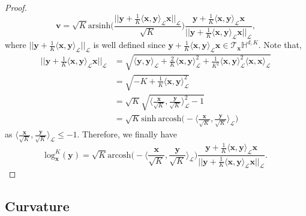 \documentclass{article}
\begin{document}
\begin{proof}
$$\mathbf{v}=\sqrt{K}\mathrm{arsinh}\bigg(\frac{||\mathbf{y}+\frac{1}{K}\langle\mathbf{x},\mathbf{y}\rangle_\mathcal{L}\mathbf{x}||_\mathcal{L}}{\sqrt{K}}\bigg)\frac{\mathbf{y}+\frac{1}{K}\langle\mathbf{x},\mathbf{y}\rangle_\mathcal{L}\mathbf{x}}{||\mathbf{y}+\frac{1}{K}\langle\mathbf{x},\mathbf{y}\rangle_\mathcal{L}\mathbf{x}||_\mathcal{L}},$$
where $||\mathbf{y}+\frac{1}{K}\langle\mathbf{x},\mathbf{y}\rangle_\mathcal{L}||_\mathcal{L}$ is well defined since $\mathbf{y}+\frac{1}{K}\langle\mathbf{x},\mathbf{y}\rangle_\mathcal{L}\mathbf{x}\in\mathcal{T}_{\mathbf{x}}\mathbb{H}^{d,K}$.
Note that,
\begin{align*}
	||\mathbf{y}+\frac{1}{K}\langle\mathbf{x},\mathbf{y}\rangle_\mathcal{L}\mathbf{x}||_\mathcal{L}&=\sqrt{\langle\mathbf{y},\mathbf{y}\rangle_\mathcal{L}+\frac{2}{K}\langle\mathbf{x},\mathbf{y}\rangle_\mathcal{L}^2+\frac{1}{K^2}\langle\mathbf{x},\mathbf{y}\rangle_\mathcal{L}^2\langle\mathbf{x},\mathbf{x}\rangle_\mathcal{L}}\\
	&=\sqrt{-K+\frac{1}{K}\langle\mathbf{x},\mathbf{y}\rangle_\mathcal{L}^2}\\
	&=\sqrt{K}\sqrt{\langle\frac{\mathbf{x}}{\sqrt{K}},\frac{\mathbf{y}}{\sqrt{K}}\rangle_\mathcal{L}^2-1}\\
	&=\sqrt{K}\mathrm{sinh}\ \mathrm{arcosh}\bigg(-\langle\frac{\mathbf{x}}{\sqrt{K}},\frac{\mathbf{y}}{\sqrt{K}}\rangle_\mathcal{L}\bigg)
\end{align*}
as $\langle\frac{\mathbf{x}}{\sqrt{K}},\frac{\mathbf{y}}{\sqrt{K}}\rangle_\mathcal{L}\le-1$.
Therefore, we finally have
$$\mathrm{log}_{\mathbf{x}}^K(\mathbf{y})=\sqrt{K}\mathrm{arcosh}\bigg(-\langle\frac{\mathbf{x}}{\sqrt{K}},\frac{\mathbf{y}}{\sqrt{K}}\rangle_\mathcal{L}\bigg)\frac{\mathbf{y}+\frac{1}{K}\langle\mathbf{x},\mathbf{y}\rangle_\mathcal{L}\mathbf{x}}{||\mathbf{y}+\frac{1}{K}\langle\mathbf{x},\mathbf{y}\rangle_\mathcal{L}\mathbf{x}||_\mathcal{L}}.$$
\end{proof}

\subsection{Curvature}\label{appendix:curvature}
\end{document}
